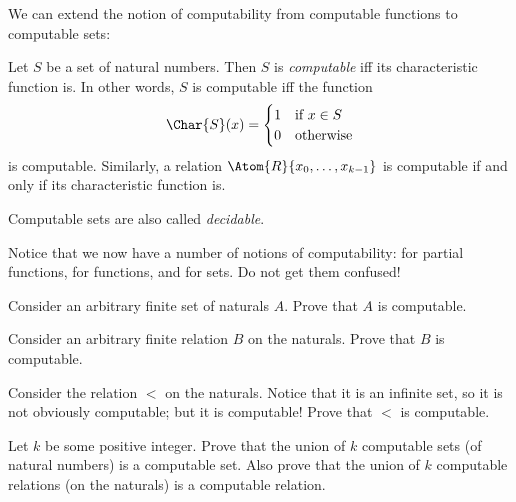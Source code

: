 \documentclass[../../../include/open-logic-section]{subfiles}
\begin{document}

We can extend the notion of computability from computable functions to
computable sets:

\begin{defn}
  Let $S$ be a set of natural numbers. Then $S$ is \emph{computable}
  iff its characteristic function is. In other words, $S$ is
  computable iff the function
\[
\Char{S}(x) =
\begin{cases}
1 & \text{if $x \in S$} \\
0 & \text{otherwise}
\end{cases}
\]
is computable. Similarly, a relation $\Atom{R}{x_0, \dots, x_{k-1}}$ is
computable if and only if its characteristic function is.
\end{defn}

\begin{explain}
Computable sets are also called \emph{decidable}.

Notice that we now have a number of notions of computability: for
partial functions, for functions, and for sets. Do not get them
confused!{} 
\end{explain}

\begin{prob}
  Consider an arbitrary finite set of naturals $A$. Prove that $A$ is computable.
\end{prob}

\begin{prob}
  Consider an arbitrary finite relation $B$ on the naturals. Prove that $B$ is computable.
\end{prob}

\begin{prob}
  Consider the relation $<$ on the naturals. Notice that it is an infinite set, so it is not obviously computable; but it is computable! Prove that $<$ is computable.
\end{prob}

\begin{prob}
  Let $k$ be some positive integer. Prove that the union of $k$ computable sets (of natural numbers) is a computable set. Also prove that the union of $k$ computable relations (on the naturals) is a computable relation.
\end{prob}
\end{document}
